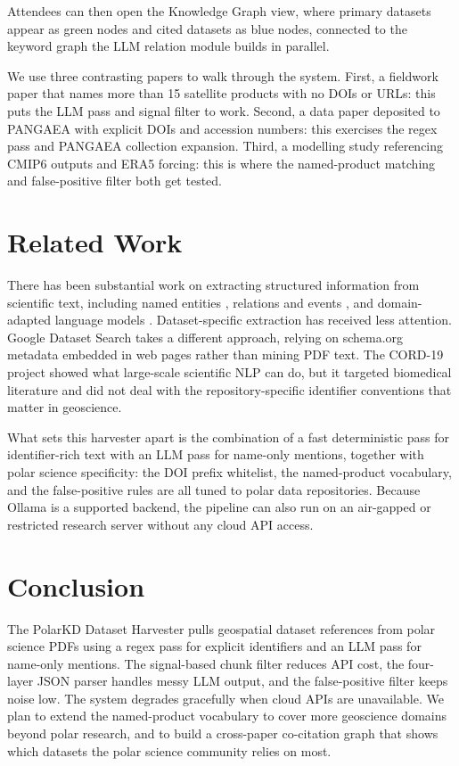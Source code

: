 \documentclass[sigconf]{acmart}
\begin{document}
Attendees can then open the Knowledge Graph view, where primary datasets appear as
green nodes and cited datasets as blue nodes, connected to the keyword graph the LLM
relation module builds in parallel.

We use three contrasting papers to walk through the system. First, a fieldwork paper
that names more than 15 satellite products with no DOIs or URLs: this puts the LLM
pass and signal filter to work. Second, a data paper deposited to PANGAEA with
explicit DOIs and accession numbers: this exercises the regex pass and PANGAEA
collection expansion. Third, a modelling study referencing CMIP6 outputs and ERA5
forcing: this is where the named-product matching and false-positive filter both get
tested.

\section{Related Work}

There has been substantial work on extracting structured information from scientific
text, including named entities \cite{luan2018}, relations and events \cite{wadden2019},
and domain-adapted language models \cite{scibert}. Dataset-specific extraction has
received less attention. Google Dataset Search \cite{datasetsearch} takes a different
approach, relying on schema.org metadata embedded in web pages rather than mining
PDF text. The CORD-19 project \cite{cord19} showed what large-scale scientific NLP
can do, but it targeted biomedical literature and did not deal with the
repository-specific identifier conventions that matter in geoscience.

What sets this harvester apart is the combination of a fast deterministic pass for
identifier-rich text with an LLM pass for name-only mentions, together with polar
science specificity: the DOI prefix whitelist, the named-product vocabulary, and the
false-positive rules are all tuned to polar data repositories. Because Ollama is a
supported backend, the pipeline can also run on an air-gapped or restricted research
server without any cloud API access.

\section{Conclusion}

The PolarKD Dataset Harvester pulls geospatial dataset references from polar science
PDFs using a regex pass for explicit identifiers and an LLM pass for name-only
mentions. The signal-based chunk filter reduces API cost, the four-layer JSON parser
handles messy LLM output, and the false-positive filter keeps noise low. The system
degrades gracefully when cloud APIs are unavailable. We plan to extend the
named-product vocabulary to cover more geoscience domains beyond polar research, and
to build a cross-paper co-citation graph that shows which datasets the polar science
community relies on most.



\end{document}
